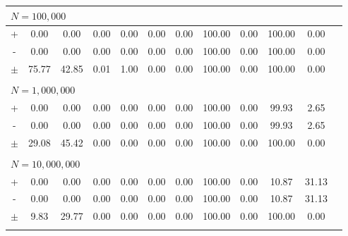 \documentclass[11pt, oneside]{amsart}   	%
\begin{document}
\begin{table}[ht]
\begin{center}
\begin{tabular}{ c c c c c c c c c c c c }
\\ \multicolumn{11}{l}{$N = 100,000$} \\ \hline
+ & 0.00 & 0.00 & 0.00 & 0.00 & 0.00 & 0.00 & 100.00 & 0.00 & 100.00 & 0.00 \\
- & 0.00 & 0.00 & 0.00 & 0.00 & 0.00 & 0.00 & 100.00 & 0.00 & 100.00 & 0.00 \\
$\pm$ & 75.77 & 42.85 & 0.01 & 1.00 & 0.00 & 0.00 & 100.00 & 0.00 & 100.00 & 0.00 \\
\\ \multicolumn{11}{l}{$N = 1,000,000$} \\ \hline
+ & 0.00 & 0.00 & 0.00 & 0.00 & 0.00 & 0.00 & 100.00 & 0.00 & 99.93 & 2.65 \\
- & 0.00 & 0.00 & 0.00 & 0.00 & 0.00 & 0.00 & 100.00 & 0.00 & 99.93 & 2.65 \\
$\pm$ & 29.08 & 45.42 & 0.00 & 0.00 & 0.00 & 0.00 & 100.00 & 0.00 & 100.00 & 0.00 \\
\\ \multicolumn{11}{l}{$N = 10,000,000$} \\ \hline
+ & 0.00 & 0.00 & 0.00 & 0.00 & 0.00 & 0.00 & 100.00 & 0.00 & 10.87 & 31.13 \\
- & 0.00 & 0.00 & 0.00 & 0.00 & 0.00 & 0.00 & 100.00 & 0.00 & 10.87 & 31.13 \\
$\pm$ & 9.83 & 29.77 & 0.00 & 0.00 & 0.00 & 0.00 & 100.00 & 0.00 & 100.00 & 0.00 \\
\\ \hline
\end{tabular}
\end{center}
\end{table}
\end{document}
